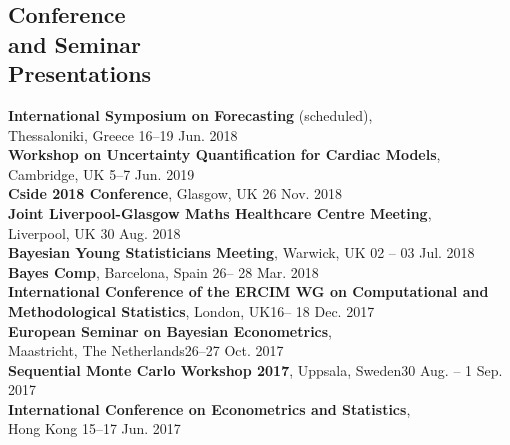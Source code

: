 \documentclass[margin,line]{resume}
\begin{document}
\begin{resume}
\section{\mysidestyle Conference \\and Seminar \\Presentations} 
	\textbf{ International Symposium on Forecasting} (scheduled),\\
	Thessaloniki, Greece \hfill 16--19 Jun. 2018 \vspace{1mm} \\	
	\textbf{Workshop on Uncertainty Quantification for Cardiac Models},\\
	Cambridge, UK \hfill 5--7 Jun. 2019 \vspace{1mm} \\		
	\textbf{Cside 2018 Conference}, Glasgow, UK \hfill 26 Nov. 2018 \vspace{1mm} \\
	\textbf{ Joint Liverpool-Glasgow Maths Healthcare Centre Meeting},\\
	Liverpool, UK \hfill 30 Aug. 2018 \vspace{1mm} \\	
	\textbf{ Bayesian Young Statisticians Meeting}, Warwick, UK \hfill 02 -- 03 Jul. 2018 \vspace{1mm} \\
	\textbf{ Bayes Comp}, Barcelona, Spain \hfill 26-- 28 Mar. 2018 \vspace{1mm} \\
	\textbf{ International Conference of the ERCIM WG on Computational and}\\
	\textbf{Methodological Statistics}, London, UK\hfill 16-- 18 Dec. 2017 \vspace{1mm} \\ 	
	\textbf{ European Seminar on Bayesian Econometrics},\\
	 Maastricht, The Netherlands\hfill 26--27 Oct. 2017 \vspace{1mm} \\ 
	\textbf{Sequential Monte Carlo Workshop 2017}, Uppsala, Sweden\hfill 30 Aug. -- 1 Sep. 2017 \vspace{1mm} \\ 
	\textbf{ International Conference on Econometrics and Statistics},\\ Hong Kong \hfill 15--17 Jun. 2017 \vspace{1mm} \\ 

\end{resume}
\end{document}
